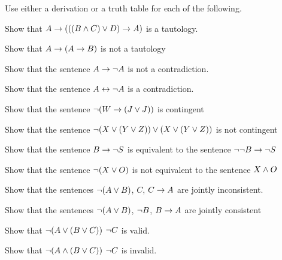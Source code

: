 \begin{practiceproblems}
\noindent\problempart Use either a derivation or a truth table for each of the following.
\begin{problemslist}%
\item Show that $A \rightarrow (((B \mathbin{\wedge} C) \vee D) \rightarrow A)$ is a tautology.
\item Show that $A \rightarrow (A \rightarrow B)$ is not a tautology
\item Show that the sentence $A \rightarrow \neg{A}$ is not a contradiction.
\item Show that the sentence $A \leftrightarrow \neg A$ is a contradiction.
\item Show that the sentence $ \neg (W \rightarrow (J \vee J)) $ is contingent
\item Show that the sentence $ \neg(X \vee (Y \vee Z)) \vee (X \vee (Y \vee Z))$ is not contingent
 \item Show that the sentence $B \rightarrow \neg S$ is equivalent to the sentence $\neg \neg B \rightarrow \neg S$
\item Show that the sentence $ \neg (X \vee O) $ is not equivalent to the sentence $X \mathbin{\wedge} O$
\item Show that the sentences $\neg(A \vee B)$, $C$, $C \rightarrow A$  are jointly inconsistent.
\item Show that the sentences $\neg(A \vee B)$, $\neg{B}$, $B \rightarrow A$ are jointly consistent
\item Show that $\neg(A \vee (B \vee C)) $ \therefore $ \neg{C}$ is valid.
\item Show that $\neg(A \mathbin{\wedge} (B \vee C))$ \therefore $ \neg{C}$ is invalid.
\end{problemslist}



\end{practiceproblems}
